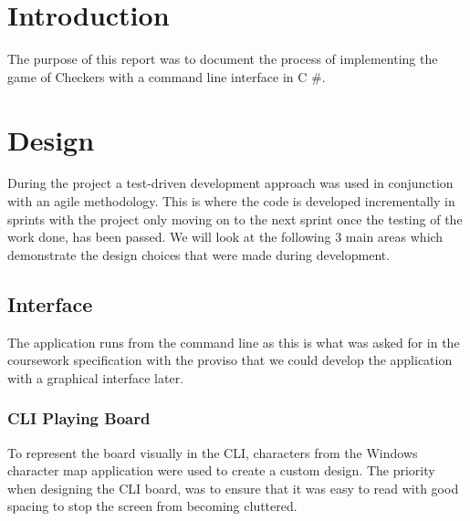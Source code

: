 \documentclass[10pt, a4paper]{article}
\title{\mytitle}
\author{\myauthor\hspace{1em}\\\contact\\Edinburgh Napier University\hspace{0.5em}-\hspace{0.5em}\mymodule}
\date{}
\begin{document}
	
\maketitle  
    
\begin{abstract}
\end{abstract}


    
    
    
\section{Introduction}
The purpose of this report was to document the process of implementing the game of Checkers with a command line interface in C \#.
    
    
    
    
    
    
    
    
    
    
    
    
\section{Design}   
During the project a test-driven development approach was used in conjunction with an agile methodology. This is where the code is developed incrementally in sprints with the project only moving on to the next sprint once the testing of the work done, has been passed. We will look at the following 3 main areas which demonstrate the design choices that were made during development.
    
        
    \subsection{Interface}
    The application runs from the command line as this is what was asked for in the coursework specification with the proviso that we could develop the application with a graphical interface later.
    
    
    	\subsubsection{CLI Playing Board}
    	To represent the board visually in the CLI, characters from the Windows character map application were used to create a custom design. The priority when designing the CLI board, was to ensure that it was easy to read with good spacing to stop the screen from becoming cluttered.
    
\end{document}

